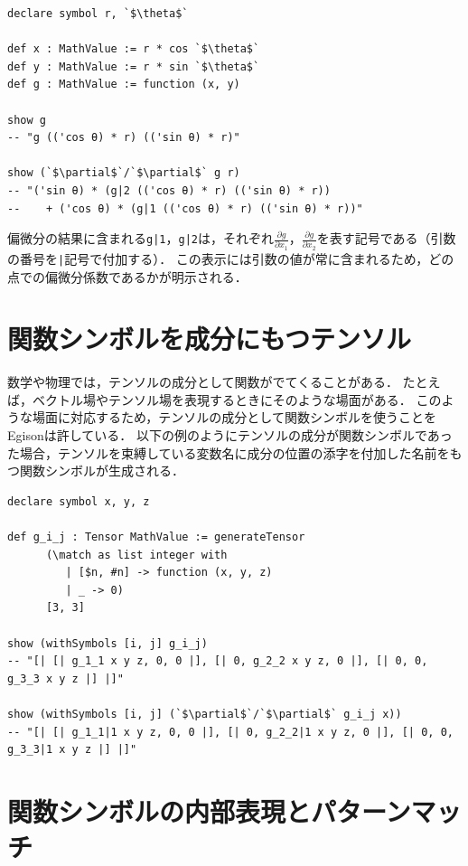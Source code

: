 \begin{lstlisting}[language=egison,numbers=none]
declare symbol r, `$\theta$`

def x : MathValue := r * cos `$\theta$`
def y : MathValue := r * sin `$\theta$`
def g : MathValue := function (x, y)

show g
-- "g (('cos θ) * r) (('sin θ) * r)"

show (`$\partial$`/`$\partial$` g r)
-- "('sin θ) * (g|2 (('cos θ) * r) (('sin θ) * r))
--    + ('cos θ) * (g|1 (('cos θ) * r) (('sin θ) * r))"
\end{lstlisting}

偏微分の結果に含まれる\verb!g|1!，\verb!g|2!は，それぞれ$\frac{\partial g}{\partial x_1}$，$\frac{\partial g}{\partial x_2}$を表す記号である（引数の番号を\verb!|!記号で付加する）．
この表示には引数の値が常に含まれるため，どの点での偏微分係数であるかが明示される．

\section{関数シンボルを成分にもつテンソル}\label{funcsym-tensor}

数学や物理では，テンソルの成分として関数がでてくることがある．
たとえば，ベクトル場やテンソル場を表現するときにそのような場面がある．
このような場面に対応するため，テンソルの成分として関数シンボルを使うことをEgisonは許している．
以下の例のようにテンソルの成分が関数シンボルであった場合，テンソルを束縛している変数名に成分の位置の添字を付加した名前をもつ関数シンボルが生成される．

\begin{lstlisting}[language=egison,numbers=none]
declare symbol x, y, z

def g_i_j : Tensor MathValue := generateTensor
      (\match as list integer with
         | [$n, #n] -> function (x, y, z)
         | _ -> 0)
      [3, 3]

show (withSymbols [i, j] g_i_j)
-- "[| [| g_1_1 x y z, 0, 0 |], [| 0, g_2_2 x y z, 0 |], [| 0, 0, g_3_3 x y z |] |]"

show (withSymbols [i, j] (`$\partial$`/`$\partial$` g_i_j x))
-- "[| [| g_1_1|1 x y z, 0, 0 |], [| 0, g_2_2|1 x y z, 0 |], [| 0, 0, g_3_3|1 x y z |] |]"
\end{lstlisting}

\section{関数シンボルの内部表現とパターンマッチ}\label{funcsym-data}


